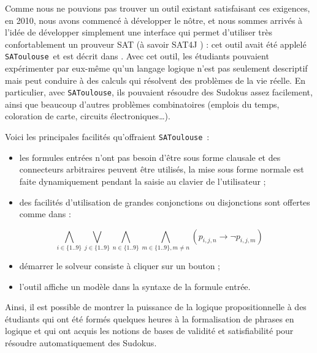 \documentclass{iaf}
\newcommand{\satoulouse}{{\sc Satoulouse}\xspace}
\renewcommand{\satoulouse}{{\sc \texttt {SAToulouse}}}
\begin{document}
Comme nous ne pouvions pas trouver un outil existant satisfaisant ces exigences, en 2010, nous avons commenc\'e \`a d\'evelopper le n\^otre, et nous sommes arriv\'es \`a l'id\'ee de d\'evelopper simplement une interface qui permet d'utiliser tr\`es confortablement un prouveur SAT (\`a savoir SAT4J \cite{DBLP:journals/jsat/BerreP10}) : cet outil avait \'et\'e applel\'e \satoulouse\ et est d\'ecrit dans \cite{GaScSt2011}. Avec cet outil, les \'etudiants pouvaient exp\'erimenter par eux-m\^eme qu'un langage logique n'est pas seulement descriptif mais peut conduire \`a des calculs qui r\'esolvent des probl\`emes de la vie r\'eelle. En particulier, avec \satoulouse, ils pouvaient r\'esoudre des Sudokus assez facilement, ainsi que beaucoup d'autres probl\`emes combinatoires (emplois du temps, coloration de carte, circuits \'electroniques\ldots).\

Voici les principales facilit\'es qu'offraient \satoulouse\ :
\begin{itemize}
\item les formules entr\'ees n'ont pas besoin d'\^etre sous forme clausale et des connecteurs arbitraires peuvent \^etre utilis\'es, la mise sous forme normale est faite dynamiquement pendant la saisie au clavier de l'utilisateur ;
\item des facilit\'es d'utilisation de grandes conjonctions ou disjonctions sont offertes comme dans :
\end{itemize}
  \[\bigwedge_{i\in\{1..9\}}
  \bigvee_{j\in\{1..9\}}\bigwedge_{n\in\{1..9\}}\bigwedge_{m\in\{1..9\},m\neq
    n}(p_{i,j,n}\rightarrow \lnot p_{i,j,m})\]
\begin{itemize}
\item d\'emarrer le solveur consiste \`a cliquer sur un bouton ;
\item l'outil affiche un mod\`ele dans la syntaxe de la formule entr\'ee.
\end{itemize}
Ainsi, il est possible de montrer la puissance de la logique propositionnelle \`a des \'etudiants qui ont \'et\'e form\'es quelques heures \`a la formalisation de phrases en logique et qui ont acquis les notions de bases de validit\'e et satisfiabilit\'e pour r\'esoudre automatiquement des Sudokus.\

 
\end{document}
